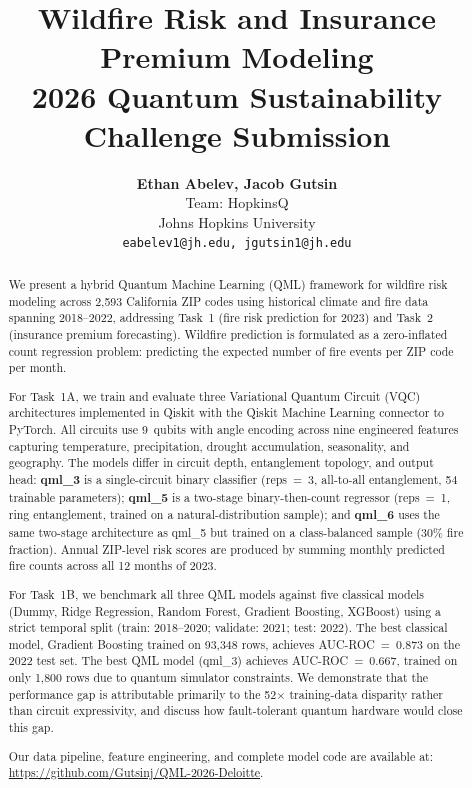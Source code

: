 \documentclass[11pt,a4paper]{article}
\title{
    \vspace{-1cm}
    \LARGE\textbf{Wildfire Risk and Insurance Premium Modeling} \\[0.4em]
    \large 2026 Quantum Sustainability Challenge Submission
}
\author{
    \textbf{Ethan Abelev, Jacob Gutsin} \\
    Team: HopkinsQ \\{}
    Johns Hopkins University \\{}
    \texttt{eabelev1@jh.edu, jgutsin1@jh.edu}
}
\date{}
\begin{document}
\maketitle
\thispagestyle{fancy}

\begin{abstract}
\noindent
We present a hybrid Quantum Machine Learning (QML) framework for wildfire risk
modeling across 2,593 California ZIP codes using historical climate and fire data
spanning 2018--2022, addressing Task~1 (fire risk prediction for 2023) and
Task~2 (insurance premium forecasting). Wildfire prediction is formulated as a
zero-inflated count regression problem: predicting the expected number of fire
events per ZIP code per month.

For Task~1A, we train and evaluate three Variational Quantum Circuit (VQC) architectures
implemented in Qiskit with the Qiskit Machine Learning connector to PyTorch.
All circuits use 9~qubits with angle encoding across nine engineered features
capturing temperature, precipitation, drought accumulation, seasonality, and geography.
The models differ in circuit depth, entanglement topology, and output head: \textbf{qml\_3}
is a single-circuit binary classifier (reps~=~3, all-to-all entanglement, 54 trainable
parameters); \textbf{qml\_5} is a two-stage binary-then-count regressor (reps~=~1,
ring entanglement, trained on a natural-distribution sample); and \textbf{qml\_6}
uses the same two-stage architecture as qml\_5 but trained on a class-balanced
sample (30\% fire fraction). Annual ZIP-level risk scores are produced by summing
monthly predicted fire counts across all 12 months of 2023.

For Task~1B, we benchmark all three QML models against five classical models
(Dummy, Ridge Regression, Random Forest, Gradient Boosting, XGBoost) using a
strict temporal split (train: 2018--2020; validate: 2021; test: 2022).
The best classical model, Gradient Boosting trained on 93,348 rows, achieves
AUC-ROC~=~0.873 on the 2022 test set. The best QML model (qml\_3) achieves
AUC-ROC~=~0.667, trained on only 1,800 rows due to quantum simulator constraints.
We demonstrate that the performance gap is attributable primarily to the 52$\times$
training-data disparity rather than circuit expressivity, and discuss how
fault-tolerant quantum hardware would close this gap.

Our data pipeline, feature engineering, and complete model code are
available at: \href{https://github.com/Gutsinj/QML-2026-Deloitte}{https://github.com/Gutsinj/QML-2026-Deloitte}.
\end{abstract}
\end{document}
